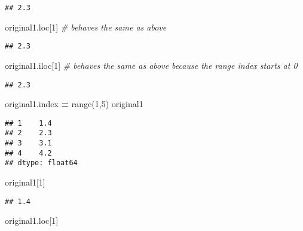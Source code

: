 \documentclass[
]{book}
\newenvironment{Shaded}{\begin{snugshade}}{\end{snugshade}}
\newcommand{\BuiltInTok}[1]{#1}
\newcommand{\CommentTok}[1]{\textcolor[rgb]{0.56,0.35,0.01}{\textit{#1}}}
\newcommand{\DecValTok}[1]{\textcolor[rgb]{0.00,0.00,0.81}{#1}}
\newcommand{\NormalTok}[1]{#1}
\newcommand{\OperatorTok}[1]{\textcolor[rgb]{0.81,0.36,0.00}{\textbf{#1}}}
\begin{document}
\begin{verbatim}
## 2.3
\end{verbatim}

\begin{Shaded}
\begin{Highlighting}[]
\NormalTok{original1.loc[}\DecValTok{1}\NormalTok{] }\CommentTok{\# behaves the same as above}
\end{Highlighting}
\end{Shaded}

\begin{verbatim}
## 2.3
\end{verbatim}

\begin{Shaded}
\begin{Highlighting}[]
\NormalTok{original1.iloc[}\DecValTok{1}\NormalTok{] }\CommentTok{\# behaves the same as above because the range index starts at 0}
\end{Highlighting}
\end{Shaded}

\begin{verbatim}
## 2.3
\end{verbatim}

\begin{Shaded}
\begin{Highlighting}[]
\NormalTok{original1.index }\OperatorTok{=} \BuiltInTok{range}\NormalTok{(}\DecValTok{1}\NormalTok{,}\DecValTok{5}\NormalTok{)}
\NormalTok{original1}
\end{Highlighting}
\end{Shaded}

\begin{verbatim}
## 1    1.4
## 2    2.3
## 3    3.1
## 4    4.2
## dtype: float64
\end{verbatim}

\begin{Shaded}
\begin{Highlighting}[]
\NormalTok{original1[}\DecValTok{1}\NormalTok{]}
\end{Highlighting}
\end{Shaded}

\begin{verbatim}
## 1.4
\end{verbatim}

\begin{Shaded}
\begin{Highlighting}[]
\NormalTok{original1.loc[}\DecValTok{1}\NormalTok{]}
\end{Highlighting}
\end{Shaded}
\end{document}
